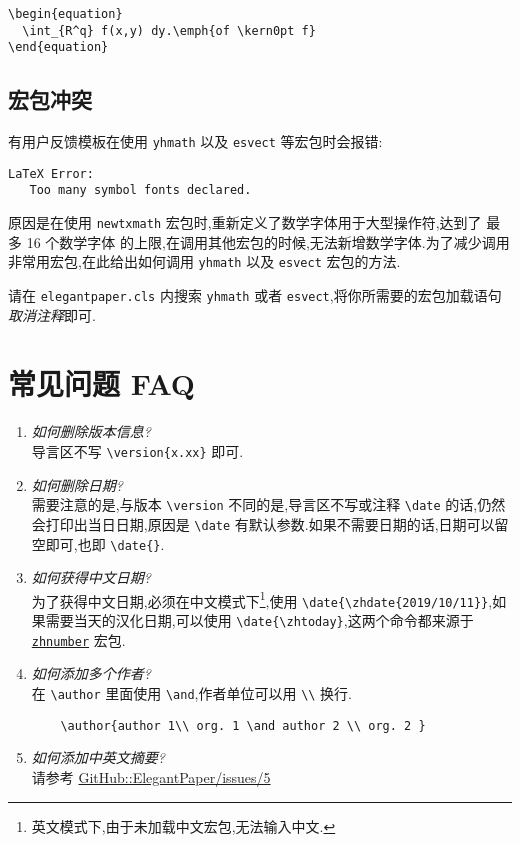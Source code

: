 \documentclass[lang=cn,a4paper]{elegantpaper}
\begin{document}
\begin{lstlisting}
\begin{equation}
  \int_{R^q} f(x,y) dy.\emph{of \kern0pt f}
\end{equation}
\end{lstlisting}

\subsection{宏包冲突}

有用户反馈模板在使用 \lstinline{yhmath} 以及 \lstinline{esvect} 等宏包时会报错:
\begin{lstlisting}
LaTeX Error:
   Too many symbol fonts declared.
\end{lstlisting}

原因是在使用 \lstinline{newtxmath} 宏包时,重新定义了数学字体用于大型操作符,达到了 {\heiti 最多 16 个数学字体} 的上限,在调用其他宏包的时候,无法新增数学字体.为了减少调用非常用宏包,在此给出如何调用 \lstinline{yhmath} 以及 \lstinline{esvect} 宏包的方法.

请在 \lstinline{elegantpaper.cls} 内搜索 \lstinline{yhmath} 或者 \lstinline{esvect},将你所需要的宏包加载语句\textit{取消注释}即可.


\section{常见问题 FAQ}

\begin{enumerate}[label=\arabic*).]
  \item \textit{如何删除版本信息?}\\
    导言区不写 \lstinline|\version{x.xx}| 即可.
  \item \textit{如何删除日期?}\\
    需要注意的是,与版本 \lstinline{\version} 不同的是,导言区不写或注释 \lstinline{\date} 的话,仍然会打印出当日日期,原因是 \lstinline{\date} 有默认参数.如果不需要日期的话,日期可以留空即可,也即 \lstinline|\date{}|.
  \item \textit{如何获得中文日期?}\\
    为了获得中文日期,必须在中文模式下\footnote{英文模式下,由于未加载中文宏包,无法输入中文.},使用 \lstinline|\date{\zhdate{2019/10/11}}|,如果需要当天的汉化日期,可以使用 \lstinline|\date{\zhtoday}|,这两个命令都来源于 \href{https://ctan.org/pkg/zhnumber}{\lstinline{zhnumber}} 宏包.
  \item \textit{如何添加多个作者?}\\
    在 \lstinline{\author} 里面使用 \lstinline{\and},作者单位可以用 \lstinline{\\} 换行.
    \begin{lstlisting}
    \author{author 1\\ org. 1 \and author 2 \\ org. 2 }
    \end{lstlisting}
  \item \textit{如何添加中英文摘要?}\\
    请参考 \href{https://github.com/ElegantLaTeX/ElegantPaper/issues/5}{GitHub::ElegantPaper/issues/5}
\end{enumerate}
\end{document}
